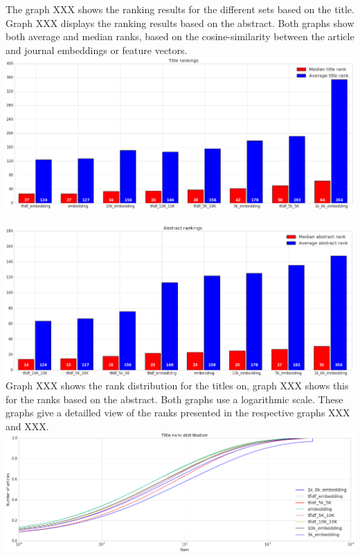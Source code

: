 \documentclass[../../Thesis.tex]{subfiles}
\begin{document}
The graph XXX shows the ranking results for the different sets based on the title. Graph XXX displays the ranking results based on the abstract. Both graphs show both average and median ranks, based on the cosine-similarity between the article and journal embeddings or feature vectors.\\
\includegraphics[width=6.5in]{Plots/Title_rankings}\\
\vspace{0.2in}\\
\includegraphics[width=6.5in]{Plots/Abstract_rankings}\\
\clearpage
{}
Graph XXX shows the rank distribution for the titles on, graph XXX shows this for the ranks based on the abstract. Both graphs use a logarithmic scale. These graphs give a detailled view of the ranks presented in the respective graphs XXX and XXX.\\
\includegraphics[width=6.5in]{Plots/Title_rank_distribution}\\
\end{document}
